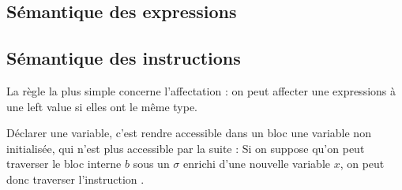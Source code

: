 \subsection{Sémantique des expressions}


\subsection{Sémantique des instructions}

La règle la plus simple concerne l'affectation : on peut affecter une
expressions à une left value si elles ont le même type.

\begin{mathpar}
\end{mathpar}

Déclarer une variable, c'est rendre accessible dans un bloc une variable non
initialisée, qui n'est plus accessible par la suite : Si on suppose qu'on peut
traverser le bloc interne $b$ sous un $σ$ enrichi d'une nouvelle variable $x$,
on peut donc traverser l'instruction .

\begin{minipage}{0.6\textwidth}
\begin{mathpar}
\end{mathpar}
\end{minipage}
\begin{minipage}{0.4\textwidth}

\end{minipage}


